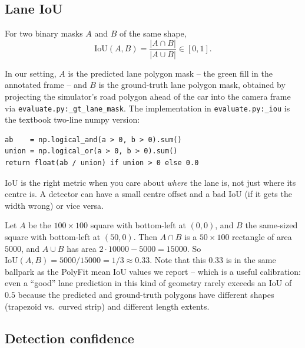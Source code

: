 \subsection{Lane IoU}

\begin{definition}
For two binary masks $A$ and $B$ of the same shape,
\[
\text{IoU}(A,B) = \frac{|A\cap B|}{|A\cup B|}\in[0,1].
\]
\end{definition}

In our setting, $A$ is the predicted lane polygon mask -- the green
fill in the annotated frame -- and $B$ is the ground-truth lane
polygon mask, obtained by projecting the simulator's road polygon
ahead of the car into the camera frame via
\texttt{evaluate.py:\_gt\_lane\_mask}. The implementation in
\texttt{evaluate.py:\_iou} is the textbook two-line numpy version:
\begin{lstlisting}
ab    = np.logical_and(a > 0, b > 0).sum()
union = np.logical_or(a > 0, b > 0).sum()
return float(ab / union) if union > 0 else 0.0
\end{lstlisting}
IoU is the right metric when you care about \emph{where} the lane is,
not just where its centre is. A detector can have a small centre
offset and a bad IoU (if it gets the width wrong) or vice versa.

\begin{example}
Let $A$ be the $100\times 100$ square with bottom-left at $(0,0)$,
and $B$ the same-sized square with bottom-left at $(50,0)$. Then
$A\cap B$ is a $50\times 100$ rectangle of area $5000$, and $A\cup B$
has area $2\cdot 10000 - 5000 = 15000$. So
$\text{IoU}(A,B) = 5000/15000 = 1/3\approx 0.33$. Note that this
$0.33$ is in the same ballpark as the PolyFit mean IoU values we
report -- which is a useful calibration: even a ``good'' lane
prediction in this kind of geometry rarely exceeds an IoU of $0.5$
because the predicted and ground-truth polygons have different shapes
(trapezoid vs.\ curved strip) and different length extents.
\end{example}

\subsection{Detection confidence}

